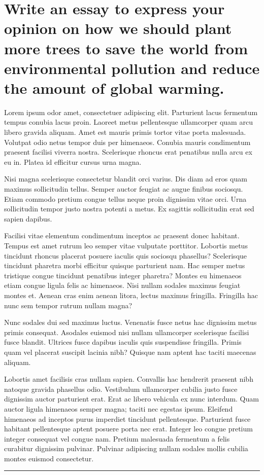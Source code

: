 \documentclass[12pt]{article}
\begin{document}
\section{Write an essay to express your opinion on how we should plant more trees to save the world from \linebreak environmental pollution and reduce the amount of global warming.}
Lorem ipsum odor amet, consectetuer adipiscing elit. Parturient lacus fermentum tempus conubia lacus proin. Laoreet metus pellentesque ullamcorper quam arcu libero gravida aliquam. Amet est mauris primis tortor vitae porta malesuada. Volutpat odio netus tempor duis per himenaeos. Conubia mauris condimentum praesent facilisi viverra nostra. Scelerisque rhoncus erat penatibus nulla arcu ex eu in. Platea id efficitur cursus urna magna.

Nisi magna scelerisque consectetur blandit orci varius. Dis diam ad eros quam maximus sollicitudin tellus. Semper auctor feugiat ac augue finibus sociosqu. Etiam commodo pretium congue tellus neque proin dignissim vitae orci. Urna sollicitudin tempor justo nostra potenti a metus. Ex sagittis sollicitudin erat sed sapien dapibus.

Facilisi vitae elementum condimentum inceptos ac praesent donec habitant. Tempus est amet rutrum leo semper vitae vulputate porttitor. Lobortis metus tincidunt rhoncus placerat posuere iaculis quis sociosqu phasellus? Scelerisque tincidunt pharetra morbi efficitur quisque parturient nam. Hac semper metus tristique congue tincidunt penatibus integer pharetra? Montes eu himenaeos etiam congue ligula felis ac himenaeos. Nisi nullam sodales maximus feugiat montes et. Aenean cras enim aenean litora, lectus maximus fringilla. Fringilla hac nunc sem tempor rutrum nullam magna?

Nunc sodales dui sed maximus luctus. Venenatis fusce netus hac dignissim metus primis consequat. Asodales euismod nisi nullam ullamcorper scelerisque facilisi fusce blandit. Ultrices fusce dapibus iaculis quis suspendisse fringilla. Primis quam vel placerat suscipit lacinia nibh? Quisque nam aptent hac taciti maecenas aliquam.

Lobortis amet facilisis cras nullam sapien. Convallis hac hendrerit praesent nibh natoque gravida phasellus odio. Vestibulum ullamcorper cubilia justo fusce dignissim auctor parturient erat. Erat ac libero vehicula ex nunc interdum. Quam auctor ligula himenaeos semper magna; taciti nec egestas ipsum. Eleifend himenaeos ad inceptos purus imperdiet tincidunt pellentesque. Parturient fusce habitant pellentesque aptent posuere porta nec erat. Integer leo congue pretium integer consequat vel congue nam. Pretium malesuada fermentum a felis curabitur dignissim pulvinar. Pulvinar adipiscing nullam sodales mollis cubilia montes euismod consectetur.
\vfill
\rule{\textwidth}{0.4pt}
\newpage
\end{document}
